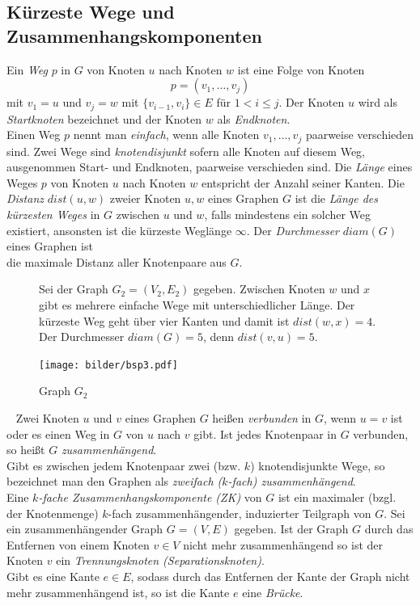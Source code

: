 \subsection{Kürzeste Wege und Zusammenhangskomponenten}
Ein \emph{Weg} $p$ in $G$ von Knoten $u$ nach Knoten $w$ ist eine Folge von Knoten $$p=(v_1,\ldots,v_j)$$ mit $v_1=u$ und $v_j=w$ mit $\{v_{i-1},v_i\}\in E$ für $1 <i \leq j$. Der Knoten $u$ wird als \emph{Startknoten} bezeichnet und der Knoten $w$ als \emph{Endknoten}.\\Einen Weg $p$ nennt man \emph{einfach}, wenn alle Knoten $v_1,\ldots,v_j$ paarweise verschieden sind. Zwei Wege sind \emph{knotendisjunkt} sofern alle Knoten auf diesem Weg, ausgenommen Start- und Endknoten, paarweise verschieden sind. Die \emph{Länge} eines Weges $p$ von Knoten $u$ nach Knoten $w$ entspricht der Anzahl seiner Kanten.\vspace{-1mm}\newline\newline
Die \emph{Distanz} $dist(u,w)$ zweier Knoten $u,w$ eines Graphen $G$ ist die \emph{Länge des kürzesten Weges} in $G$ zwischen $u$ und $w$, falls mindestens ein solcher Weg existiert, ansonsten ist die kürzeste Weglänge $\infty$. Der \emph{Durchmesser} $diam(G)$ eines Graphen ist\\die maximale Distanz aller Knotenpaare aus $G$.

\begin{figure}[h!]
\begin{minipage}{230pt}
Sei der Graph $G_2=(V_2,E_2)$ gegeben. Zwischen Knoten $w$ und $x$ gibt es mehrere einfache Wege mit unterschiedlicher Länge. Der kürzeste Weg geht über vier Kanten und damit ist $dist(w, x)=4$. Der Durchmesser $diam(G)=5$, denn $dist(v, u)=5$.
\end{minipage}
\begin{minipage}{220pt}
		\centering 		 
   \texttt{[image: bilder/bsp3.pdf]}
	\caption{Graph $G_2$}
\end{minipage}
  	 \end{figure}
  	 \vspace{-2mm}
  	 ~\linebreak
Zwei Knoten $u$ und $v$ eines Graphen $G$ heißen \emph{verbunden} in $G$, wenn $u = v$ ist oder es einen Weg in $G$ von $u$ nach $v$ gibt. Ist jedes Knotenpaar in $G$ verbunden, so heißt $G$ \emph{zusammenhängend}.\\Gibt es zwischen jedem Knotenpaar zwei (bzw. $k$) knotendisjunkte Wege, so bezeichnet man den Graphen als \emph{zweifach ($k$-fach) zusammenhängend}.\\Eine \emph{$k$-fache Zusammenhangskomponente (ZK)} von $G$ ist ein maximaler (bzgl. der Knotenmenge) $k$-fach zusammenhängender, induzierter Teilgraph von $G$.\newline\newline
Sei ein zusammenhängender Graph $G=(V,E)$ gegeben. Ist der Graph $G$ durch das Entfernen von einem Knoten $v \in V$ nicht mehr zusammenhängend so ist der Knoten $v$ ein \emph{Trennungsknoten (Separationsknoten)}.\\Gibt es eine Kante $e \in E$, sodass durch das Entfernen der Kante der Graph nicht mehr zusammenhängend ist, so ist die Kante $e$ eine \emph{Brücke}.

